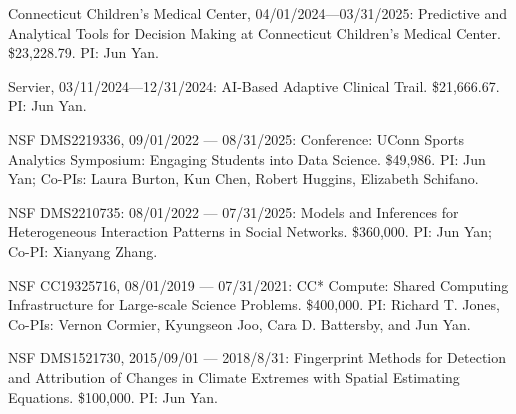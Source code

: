 \documentclass[Statistics]{vita}
\begin{document}
\begin{vita}
\begin{TeachingAccomplishments}
  \end{TeachingAccomplishments}
  \begin{Grants}
    \begin{External}
    \item Connecticut Children's Medical Center, 04/01/2024---03/31/2025: Predictive and Analytical Tools for Decision Making at Connecticut Children’s Medical Center. \$23,228.79. PI: Jun Yan.
    \item Servier, 03/11/2024---12/31/2024: AI-Based Adaptive Clinical Trail. \$21,666.67.  PI: Jun Yan.
    \item NSF DMS2219336, 09/01/2022 --- 08/31/2025: Conference: UConn Sports Analytics Symposium: Engaging Students into Data Science. \$49,986. PI: Jun Yan; Co-PIs: Laura Burton, Kun Chen,  Robert Huggins, Elizabeth Schifano.
    \item NSF DMS2210735: 08/01/2022 --- 07/31/2025: Models and Inferences for Heterogeneous Interaction Patterns in Social Networks. \$360,000. PI: Jun Yan; Co-PI: Xianyang Zhang.
    \item NSF CC19325716, 08/01/2019 --- 07/31/2021: CC* Compute: Shared Computing Infrastructure for Large-scale Science Problems. \$400,000. PI:  Richard T. Jones, Co-PIs: Vernon Cormier, Kyungseon Joo, Cara D. Battersby, and Jun Yan.
    \item NSF DMS1521730, 2015/09/01 --- 2018/8/31: Fingerprint Methods for Detection and Attribution of Changes in Climate Extremes with Spatial Estimating Equations. \$100,000. PI: Jun Yan.

\end{External}
\end{Grants}
\end{vita}
\end{document}
